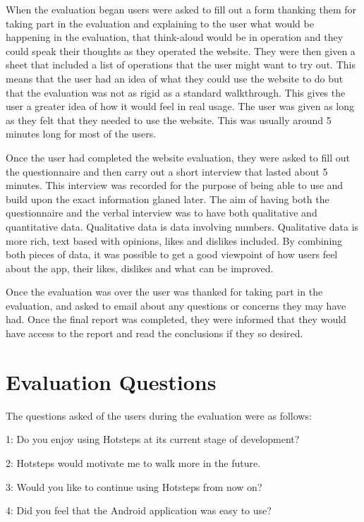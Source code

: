 \documentclass{l4proj}
\begin{document}
When the evaluation began users were asked to fill out a form thanking them for taking part in the evaluation and explaining to the user what would be happening in the evaluation, that think-aloud would be in operation and they could speak their thoughts as they operated the website. They were then given a sheet that included a list of operations that the user might want to try out. This means that the user had an idea of what they could use the website to do but that the evaluation was not as rigid as a standard walkthrough. This gives the user a greater idea of how it would feel in real usage. The user was given as long as they felt that they needed to use the website. This was usually around 5 minutes long for most of the users.

Once the user had completed the website evaluation, they were asked to fill out the questionnaire and then carry out a short interview that lasted about 5 minutes. This interview was recorded for the purpose of being able to use and build upon the exact information glaned later. The aim of having both the questionnaire and the verbal interview was to have both qualitative and quantitative data. Qualitative data is data involving numbers. Qualitative data is more rich, text based with opinions, likes and dislikes included. By combining both pieces of data, it was possible to get a good viewpoint of how users feel about the app, their likes, dislikes and what can be improved.

Once the evaluation was over the user was thanked for taking part in the evaluation, and asked to email about any questions or concerns they may have had. Once the final report was completed, they were informed that they would have access to the report and read the conclusions if they so desired.

\section{Evaluation Questions}

The questions asked of the users during the evaluation were as follows:

1: Do you enjoy using Hotsteps at its current stage of development?

2: Hotsteps would motivate me to walk more in the future.

3:  Would you like to continue using Hotsteps from now on?

4: Did you feel that the Android application was easy to use?
\end{document}

